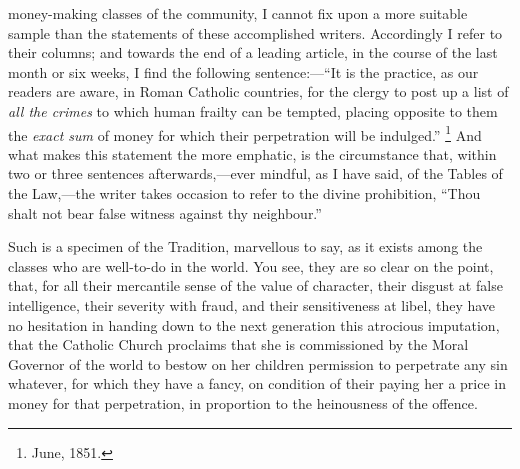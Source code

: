 money-making classes of the community, I cannot fix upon
a more suitable sample than the statements of these
accomplished writers. Accordingly I refer to their
columns; and towards the end of a leading article, in the
course of the last month or six weeks, I find the
following sentence:—``It is the practice, as
our readers are aware, in Roman Catholic countries, for
the clergy to post up a list of \emph{all the crimes}
to which human frailty can be tempted, placing opposite
to them the \emph{exact sum} of money for which their
perpetration will be indulged.'' \footnote{June, 1851.} And
what makes this statement the more emphatic, is the
circumstance that, within two or three sentences
afterwards,—ever mindful, as I have said, of the
Tables of the Law,—the writer takes occasion to
refer to the divine prohibition, ``Thou shalt not
bear false witness against thy neighbour.''

Such is a specimen of the Tradition, marvellous to
say, as it exists among the classes who are well-to-do in
the world. You see, they are so clear on the point, that,
for all their mercantile sense of the value of character,
their disgust at false intelligence, their severity with
fraud, and their sensitiveness at libel, they have no
hesitation in handing down to the next generation this
atrocious imputation, that the Catholic Church proclaims
that she is commissioned by the Moral Governor of the
world to bestow on her children permission to perpetrate
any sin whatever, for which they have a fancy, on
condition of their paying her a price in money for that
perpetration, in proportion to the heinousness of the
offence.

